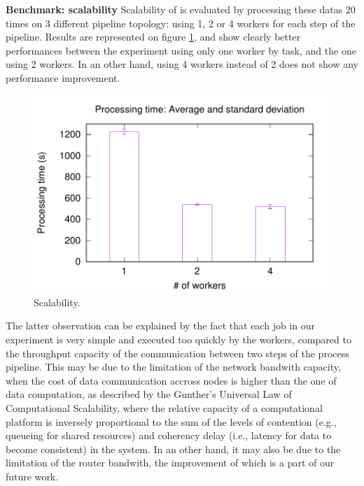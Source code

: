 \textbf{Benchmark: scalability}
Scalability of \SYS is evaluated by processing these datas 20 times on 3 different pipeline topology: using 1, 2 or 4 workers for each step of the pipeline.
Results are represented on figure \ref{fig:scalability}, and show clearly better performances between the experiment using only one worker by task, and the one using 2 workers.
In an other hand, using 4 workers instead of 2 does not show any performance improvement.

\begin{figure}[t!]
  \centering
  \includegraphics[width=.99\linewidth]{images/avg_stdev_4_streams}
  \caption{Scalability.}
  \label{fig:scalability}
\end{figure}

The latter observation can be explained by the fact that each job in our experiment is very simple and executed too quickly by the workers, compared to the throughput capacity of the communication between two steps of the process pipeline.
This may be due to the limitation of the network bandwith capacity, when the cost of data communication accross nodes is higher than the one of data computation, as described by the Gunther's Universal Law of Computational Scalability\cite{gunther1993simple}, where the relative capacity of a computational platform is inversely proportional to the sum of the levels of contention (e.g., queueing for shared resources) and coherency delay (i.e., latency for data to become consistent) in the system.
In an other hand, it may also be due to the limitation of the router bandwith, the improvement of which is a part of our future work.
